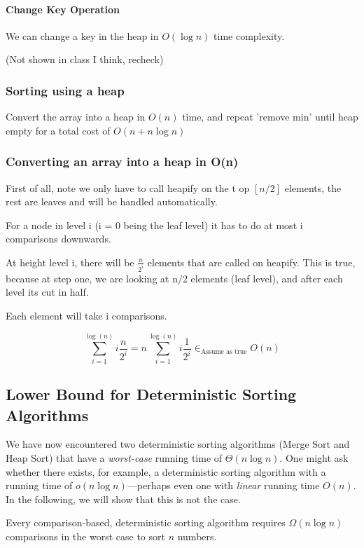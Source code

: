 \paragraph{Change Key Operation}

\begin{lem}
We can change a key in the heap in $O(\log n )$ time complexity.
\end{lem}
(Not shown in class I think, recheck)

\subsubsection{Sorting using a heap}
Convert the array into a heap in $O(n)$ time, and repeat 'remove min' until heap empty for a total cost of $O(n + n \log n )$

\subsubsection{Converting an array into a heap in O(n)}
First of all, note we only have to call heapify on the t op $[n/2]$ elements, the rest are leaves and will be handled automatically.

For a node in level i (i = 0 being the leaf level) it has to do at most i comparisons downwards.

At height level i, there will be $\frac{n}{2^i}$ elements that are called on heapify. This is true, because at step one, we are looking at n/2 elements (leaf level), and after each level its cut in half.

Each element will take i comparisons.

\[\sum_{i=1}^{\log(n)}i \frac{n}{2^{i}} =n\sum_{i=1}^{\log(n)}i \frac{1}{2^{i}} \in_{\text{Assume as true}} O(n)\]

\subsection{Lower Bound for Deterministic Sorting Algorithms}

We have now encountered two deterministic sorting algorithms (Merge Sort and Heap Sort)
that have a \emph{worst-case} running time of $\Theta(n \log n)$.
One might ask whether there exists, for example, a deterministic sorting algorithm
with a running time of $o(n \log n)$—perhaps even one with
\emph{linear} running time $O(n)$.  
In the following, we will show that this is not the case.

\begin{thm}
Every comparison-based, deterministic sorting algorithm requires
$\Omega(n \log n)$ comparisons in the worst case to sort $n$ numbers.
\end{thm}

